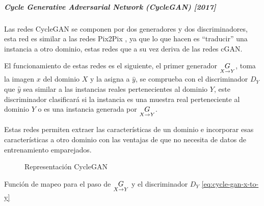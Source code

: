 \subparagraph{Cycle Generative Adversarial Network (CycleGAN) [2017]}
Las redes \gls{CycleGAN} \cite{CycleGAN-zhu2020unpaired,CycleGAN-caleb2021Unpaired,CycleGAN-theiler2019thebeautyofcyclegan} se componen por dos generadores y dos discriminadores, esta red es similar a las redes \gls{Pix2Pix} \cite{pix2pix-isola2018imagetoimage}, ya que lo que hacen es ``traducir'' una instancia a otro dominio, estas redes que a su vez deriva de las redes \gls{cGAN}.

El funcionamiento de estas redes es el siguiente, el primer generador ${\underset{X\rightarrow{}Y}{G}}$, toma la imagen ${x}$ del dominio ${X}$ y la asigna a ${\hat{y}}$, se comprueba con el discriminador ${D_{Y}}$ que ${\hat{y}}$ sea similar a las instancias reales pertenecientes al dominio ${Y}$, este discriminador clasificará si la instancia es una muestra real perteneciente al dominio ${Y}$ o es una instancia generada por ${\underset{X\rightarrow{}Y}{G}}$.


Estas redes permiten extraer las características de un dominio e incorporar esas características a otro dominio con las ventajas de que no necesita de datos de entrenamiento emparejados.

\begin{figure}[H]
    \centering
    \caption{Representación CycleGAN}
    \label{fig:fig-cyclegan}
\end{figure}

Función de mapeo para el paso de ${\underset{X\rightarrow{}Y}{G}}$ y el discriminador $D_{Y}$ \ref{eq:cycle-gan-x-to-y}

